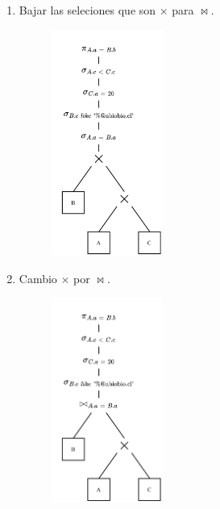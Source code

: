 \documentclass{templateNote}
\begin{document}
\begin{enumerate}
\begin{itemize}
\begin{enumerate}
            \item Bajar las seleciones que son $\times$ para $\Join$.
            \begin{figure}[H]
                \centering
                \includegraphics[width=0.345\textwidth]{img/E3-Paso-3.png}
            \end{figure}

            \item Cambio $\times$ por $\Join$.
            \begin{figure}[H]
                \centering
                \includegraphics[width=0.345\textwidth]{img/E3-Paso-4.png}
            \end{figure}


\end{enumerate}
\end{itemize}
\end{enumerate}
\end{document}
